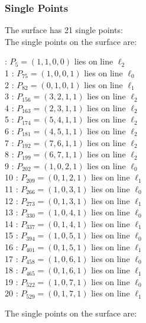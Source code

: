 \documentclass{article}
\begin{document}
{\subsubsection*{Single Points}
The surface has 21 single points:\\
The single points on the surface are:\\
\begin{multicols}{2}
 : $P_{5}=( 1, 1, 0, 0 )$ lies on line $\ell_{2}$\\
1 : $P_{75}=( 1, 0, 0, 1 )$ lies on line $\ell_{0}$\\
2 : $P_{82}=( 0, 1, 0, 1 )$ lies on line $\ell_{1}$\\
3 : $P_{156}=( 3, 2, 1, 1 )$ lies on line $\ell_{2}$\\
4 : $P_{163}=( 2, 3, 1, 1 )$ lies on line $\ell_{2}$\\
5 : $P_{174}=( 5, 4, 1, 1 )$ lies on line $\ell_{2}$\\
6 : $P_{181}=( 4, 5, 1, 1 )$ lies on line $\ell_{2}$\\
7 : $P_{192}=( 7, 6, 1, 1 )$ lies on line $\ell_{2}$\\
8 : $P_{199}=( 6, 7, 1, 1 )$ lies on line $\ell_{2}$\\
9 : $P_{202}=( 1, 0, 2, 1 )$ lies on line $\ell_{0}$\\
10 : $P_{209}=( 0, 1, 2, 1 )$ lies on line $\ell_{1}$\\
11 : $P_{266}=( 1, 0, 3, 1 )$ lies on line $\ell_{0}$\\
12 : $P_{273}=( 0, 1, 3, 1 )$ lies on line $\ell_{1}$\\
13 : $P_{330}=( 1, 0, 4, 1 )$ lies on line $\ell_{0}$\\
14 : $P_{337}=( 0, 1, 4, 1 )$ lies on line $\ell_{1}$\\
15 : $P_{394}=( 1, 0, 5, 1 )$ lies on line $\ell_{0}$\\
16 : $P_{401}=( 0, 1, 5, 1 )$ lies on line $\ell_{1}$\\
17 : $P_{458}=( 1, 0, 6, 1 )$ lies on line $\ell_{0}$\\
18 : $P_{465}=( 0, 1, 6, 1 )$ lies on line $\ell_{1}$\\
19 : $P_{522}=( 1, 0, 7, 1 )$ lies on line $\ell_{0}$\\
20 : $P_{529}=( 0, 1, 7, 1 )$ lies on line $\ell_{1}$\\
\end{multicols}
The single points on the surface are:\\
}
\end{document}
